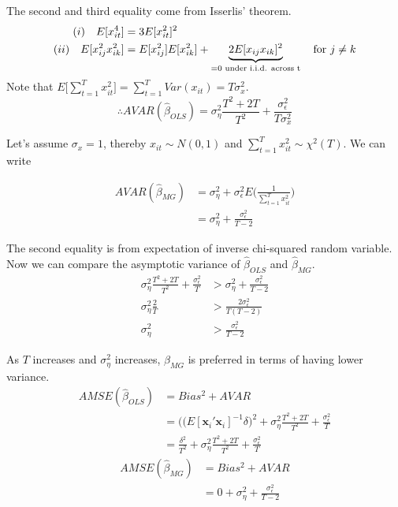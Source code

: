 \vspace{0.2in}


The second and third equality come from Isserlis' theorem.
\begin{align*}
(i)\quad E[x_{it}^4] &= 3 E[x_{it}^2]^2 \\
(ii) \quad E[x_{ij}^2 x_{ik}^2] &= E[x_{ij}^2] E[x_{ik}^2] + \underbrace{2E[x_{ij}x_{ik}]^2}_{=0 \text{\,\,under i.i.d. across t}} \quad \text{for $j \neq k$}
\end{align*}
\vspace{0.2in}
Note that $E\big [\sum_{t=1}^T x_{it}^2  \big] = \sum_{t=1}^T Var(x_{it}) = T\sigma_x^2$.
\[
\therefore AVAR(\widehat{\beta}_{OLS}) = \sigma_\eta^2 \frac{T^2 +2T}{T^2} + \frac{\sigma_\epsilon^2}{T\sigma_x^2}
\]

Let's assume $\sigma_x = 1$, thereby $x_{it} \sim N(0,1)$ and  $\sum_{t=1}^Tx_{it}^2 \sim \chi^2(T)$. We can write

\begin{align*}
AVAR(\widehat{\beta}_{MG}) &= \sigma_\eta^2 + \sigma_\epsilon^2 E\bigg(\frac{1}{\sum_{t=1}^T x_{it}^2}\bigg)\\
& = \sigma_\eta^2 + \frac{\sigma_\epsilon^2}{T-2}
\end{align*}

The second equality is from expectation of inverse chi-squared random variable. Now we can compare the asymptotic variance of $\widehat{\beta}_{OLS}$ and $\widehat{\beta}_{MG}$.
\begin{align*}
\sigma_\eta^2 \frac{T^2 +2T}{T^2} + \frac{\sigma_\epsilon^2}{T} &> \sigma_\eta^2 + \frac{\sigma_\epsilon^2}{T-2}\\
\sigma_\eta^2 \frac{2}{T} &> \frac{2\sigma_\epsilon^2}{T(T-2)}\\
\sigma_\eta^2 &> \frac{\sigma_\epsilon^2}{T-2}
\end{align*}

As $T$ increases and $\sigma_\eta^2$ increases, $\widehat{\beta}_{MG}$ is preferred in terms of having lower variance.
\begin{align*}
AMSE(\widehat{\beta}_{OLS}) & = Bias^2 + AVAR \\
&= \bigg( \big(E[\mathbf{x}_i'\mathbf{x}_i]^{-1} \delta\bigg)^2 + \sigma_\eta^2 \frac{T^2+2T}{T^2} + \frac{\sigma_\epsilon^2}{T}\\
&= \frac{\delta^2}{T^2} + \sigma_\eta^2 \frac{T^2+2T}{T^2} + \frac{\sigma_\epsilon^2}{T}
\end{align*}
\begin{align*}
AMSE(\widehat{\beta}_{MG}) & = Bias^2 + AVAR \\
&= 0 + \sigma_\eta^2 + \frac{\sigma_\epsilon^2}{T-2}\\
\end{align*}

